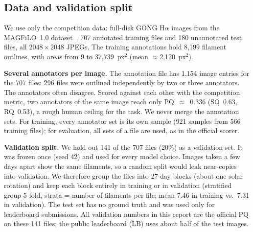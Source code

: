 \subsection{Data and validation split}\label{sec:data}
We use only the competition data: full-disk GONG H$\alpha$ images from
the MAGFiLO~1.0 dataset~\cite{ahmadzadeh2024dataset}, 707 annotated training files and
180 unannotated test files, all $2048\times2048$ JPEGs.
The training annotations hold 8{,}199 filament outlines, with areas from
9 to 37{,}739~px$^2$ (mean $\approx$2{,}120~px$^2$).

\textbf{Several annotators per image.} The annotation file has 1{,}154
image entries for the 707 files: 296 files were outlined independently by
two or three annotators.
The annotators often disagree. Scored against each other with the
competition metric, two annotators of the same image reach only
PQ~$\approx$~0.336 (SQ~0.63, RQ~0.53), a rough human ceiling for the task.
We never merge the annotation sets. For training, every annotator set is
its own sample (921 samples from 566 training files); for evaluation, all
sets of a file are used, as in the official scorer.

\textbf{Validation split.} We hold out 141 of the 707 files (20\%) as a
validation set. It was frozen once (seed 42) and used for every model
choice.
Images taken a few days apart show the same filaments, so a random split
would leak near-copies into validation. We therefore group the files into
27-day blocks (about one solar rotation) and keep each block entirely in
training or in validation (stratified group 5-fold, strata = number of
filaments per file; mean 7.46 in training vs.\ 7.31 in validation).
The test set has no ground truth and was used only for leaderboard
submissions. All validation numbers in this report are the official PQ on
these 141 files; the public leaderboard (LB) uses about half of the test
images.

